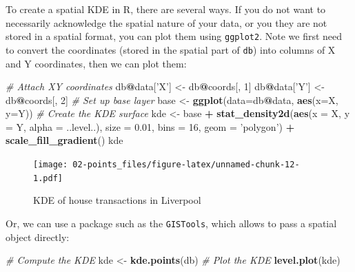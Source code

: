 \documentclass[]{book}
\newenvironment{Shaded}{\begin{snugshade}}{\end{snugshade}}
\newcommand{\KeywordTok}[1]{\textcolor[rgb]{0.13,0.29,0.53}{\textbf{#1}}}
\newcommand{\DataTypeTok}[1]{\textcolor[rgb]{0.13,0.29,0.53}{#1}}
\newcommand{\DecValTok}[1]{\textcolor[rgb]{0.00,0.00,0.81}{#1}}
\newcommand{\FloatTok}[1]{\textcolor[rgb]{0.00,0.00,0.81}{#1}}
\newcommand{\StringTok}[1]{\textcolor[rgb]{0.31,0.60,0.02}{#1}}
\newcommand{\CommentTok}[1]{\textcolor[rgb]{0.56,0.35,0.01}{\textit{#1}}}
\newcommand{\OperatorTok}[1]{\textcolor[rgb]{0.81,0.36,0.00}{\textbf{#1}}}
\newcommand{\NormalTok}[1]{#1}
\begin{document}
To create a spatial KDE in R, there are several ways. If you do not want
to necessarily acknowledge the spatial nature of your data, or you they
are not stored in a spatial format, you can plot them using
\texttt{ggplot2}. Note we first need to convert the coordinates (stored
in the spatial part of \texttt{db}) into columns of X and Y coordinates,
then we can plot them:

\begin{Shaded}
\begin{Highlighting}[]
\CommentTok{# Attach XY coordinates}
\NormalTok{db}\OperatorTok{@}\NormalTok{data[}\StringTok{'X'}\NormalTok{] <-}\StringTok{ }\NormalTok{db}\OperatorTok{@}\NormalTok{coords[, }\DecValTok{1}\NormalTok{]}
\NormalTok{db}\OperatorTok{@}\NormalTok{data[}\StringTok{'Y'}\NormalTok{] <-}\StringTok{ }\NormalTok{db}\OperatorTok{@}\NormalTok{coords[, }\DecValTok{2}\NormalTok{]}
\CommentTok{# Set up base layer}
\NormalTok{base <-}\StringTok{ }\KeywordTok{ggplot}\NormalTok{(}\DataTypeTok{data=}\NormalTok{db}\OperatorTok{@}\NormalTok{data, }\KeywordTok{aes}\NormalTok{(}\DataTypeTok{x=}\NormalTok{X, }\DataTypeTok{y=}\NormalTok{Y))}
\CommentTok{# Create the KDE surface}
\NormalTok{kde <-}\StringTok{ }\NormalTok{base }\OperatorTok{+}\StringTok{ }\KeywordTok{stat_density2d}\NormalTok{(}\KeywordTok{aes}\NormalTok{(}\DataTypeTok{x =}\NormalTok{ X, }\DataTypeTok{y =}\NormalTok{ Y, }\DataTypeTok{alpha =}\NormalTok{ ..level..), }
               \DataTypeTok{size =} \FloatTok{0.01}\NormalTok{, }\DataTypeTok{bins =} \DecValTok{16}\NormalTok{, }\DataTypeTok{geom =} \StringTok{'polygon'}\NormalTok{) }\OperatorTok{+}
\StringTok{            }\KeywordTok{scale_fill_gradient}\NormalTok{()}
\NormalTok{kde}
\end{Highlighting}
\end{Shaded}

\begin{figure}
\centering
\texttt{[image: 02-points\_files/figure-latex/unnamed-chunk-12-1.pdf]}
\caption{\label{fig:unnamed-chunk-12}KDE of house transactions in Liverpool}
\end{figure}

Or, we can use a package such as the \texttt{GISTools}, which allows to
pass a spatial object directly:

\begin{Shaded}
\begin{Highlighting}[]
\CommentTok{# Compute the KDE}
\NormalTok{kde <-}\StringTok{ }\KeywordTok{kde.points}\NormalTok{(db)}
\CommentTok{# Plot the KDE}
\KeywordTok{level.plot}\NormalTok{(kde)}
\end{Highlighting}
\end{Shaded}
\end{document}
